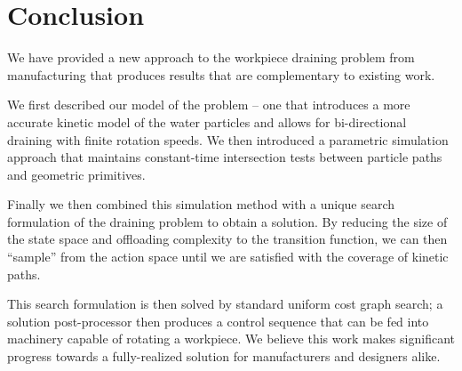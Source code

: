 						\chapter{Conclusion}

We have provided a new approach to the workpiece draining problem from manufacturing that produces results that are complementary to existing work.

We first described our model of the problem -- one that introduces a more accurate kinetic model of the water particles and allows for bi-directional draining with finite rotation speeds. We then introduced a parametric simulation approach that maintains constant-time intersection tests between particle paths and geometric primitives.

Finally we then combined this simulation method with a unique search formulation of the draining problem to obtain a solution. By reducing the size of the state space and offloading complexity to the transition function, we can then ``sample'' from the action space until we are satisfied with the coverage of kinetic paths.

This search formulation is then solved by standard uniform cost graph search; a solution post-processor then produces a control sequence that can be fed into machinery capable of rotating a workpiece. We believe this work makes significant progress towards a fully-realized solution for manufacturers and designers alike.
